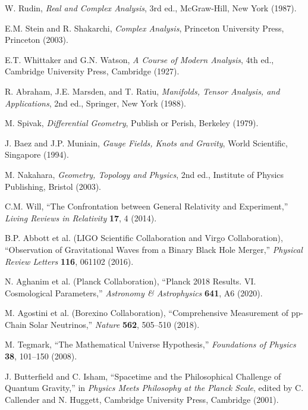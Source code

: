 \documentclass[12pt,a4paper]{article}
\begin{document}
\begin{thebibliography}{99}
 W. Rudin, \emph{Real and Complex Analysis}, 3rd ed., McGraw-Hill, New York (1987).

 E.M. Stein and R. Shakarchi, \emph{Complex Analysis}, Princeton University Press, Princeton (2003).

 E.T. Whittaker and G.N. Watson, \emph{A Course of Modern Analysis}, 4th ed., Cambridge University Press, Cambridge (1927).

 R. Abraham, J.E. Marsden, and T. Ratiu, \emph{Manifolds, Tensor Analysis, and Applications}, 2nd ed., Springer, New York (1988).

 M. Spivak, \emph{Differential Geometry}, Publish or Perish, Berkeley (1979).

 J. Baez and J.P. Muniain, \emph{Gauge Fields, Knots and Gravity}, World Scientific, Singapore (1994).

 M. Nakahara, \emph{Geometry, Topology and Physics}, 2nd ed., Institute of Physics Publishing, Bristol (2003).

 C.M. Will, ``The Confrontation between General Relativity and Experiment,'' \emph{Living Reviews in Relativity} \textbf{17}, 4 (2014).

 B.P. Abbott et al. (LIGO Scientific Collaboration and Virgo Collaboration), ``Observation of Gravitational Waves from a Binary Black Hole Merger,'' \emph{Physical Review Letters} \textbf{116}, 061102 (2016).

 N. Aghanim et al. (Planck Collaboration), ``Planck 2018 Results. VI. Cosmological Parameters,'' \emph{Astronomy \& Astrophysics} \textbf{641}, A6 (2020).

 M. Agostini et al. (Borexino Collaboration), ``Comprehensive Measurement of pp-Chain Solar Neutrinos,'' \emph{Nature} \textbf{562}, 505--510 (2018).

 M. Tegmark, ``The Mathematical Universe Hypothesis,'' \emph{Foundations of Physics} \textbf{38}, 101--150 (2008).

 J. Butterfield and C. Isham, ``Spacetime and the Philosophical Challenge of Quantum Gravity,'' in \emph{Physics Meets Philosophy at the Planck Scale}, edited by C. Callender and N. Huggett, Cambridge University Press, Cambridge (2001).


\end{thebibliography}
\end{document}
